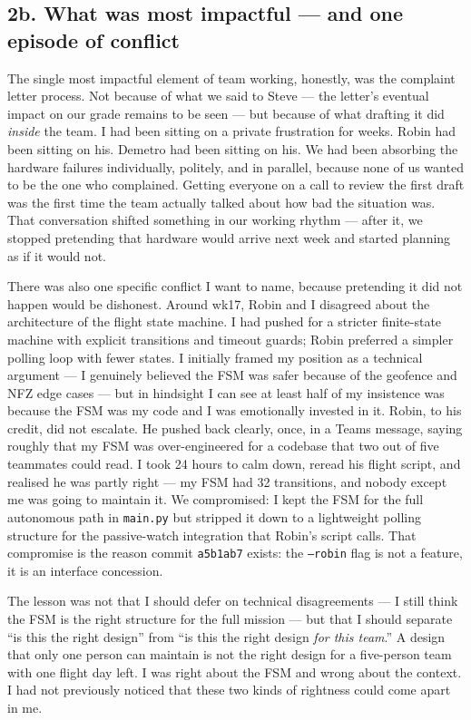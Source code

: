 \subsection*{2b. What was most impactful --- and one episode of conflict}

The single most impactful element of team working, honestly, was the complaint letter process. Not because of what we said to Steve --- the letter's eventual impact on our grade remains to be seen --- but because of what drafting it did \emph{inside} the team. I had been sitting on a private frustration for weeks. Robin had been sitting on his. Demetro had been sitting on his. We had been absorbing the hardware failures individually, politely, and in parallel, because none of us wanted to be the one who complained. Getting everyone on a call to review the first draft was the first time the team actually talked about how bad the situation was. That conversation shifted something in our working rhythm --- after it, we stopped pretending that hardware would arrive next week and started planning as if it would not.

There was also one specific conflict I want to name, because pretending it did not happen would be dishonest. Around wk17, Robin and I disagreed about the architecture of the flight state machine. I had pushed for a stricter finite-state machine with explicit transitions and timeout guards; Robin preferred a simpler polling loop with fewer states. I initially framed my position as a technical argument --- I genuinely believed the FSM was safer because of the geofence and NFZ edge cases --- but in hindsight I can see at least half of my insistence was because the FSM was my code and I was emotionally invested in it. Robin, to his credit, did not escalate. He pushed back clearly, once, in a Teams message, saying roughly that my FSM was over-engineered for a codebase that two out of five teammates could read. I took 24 hours to calm down, reread his flight script, and realised he was partly right --- my FSM had 32 transitions, and nobody except me was going to maintain it. We compromised: I kept the FSM for the full autonomous path in \texttt{main.py} but stripped it down to a lightweight polling structure for the passive-watch integration that Robin's script calls. That compromise is the reason commit \texttt{a5b1ab7} exists: the \texttt{--robin} flag is not a feature, it is an interface concession.

The lesson was not that I should defer on technical disagreements --- I still think the FSM is the right structure for the full mission --- but that I should separate ``is this the right design'' from ``is this the right design \emph{for this team}.'' A design that only one person can maintain is not the right design for a five-person team with one flight day left. I was right about the FSM and wrong about the context. I had not previously noticed that these two kinds of rightness could come apart in me.

